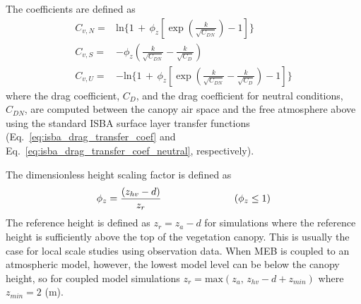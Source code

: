 The coefficients are defined as
%
\begin{align}
%
\label{eq:meb_fv_velc_neutral_c} 
C_{v,N} =& {\mathrm{ln}} \Bigg\lbrace 
1 \,+\, \phi_z
\left[\exp \left({\frac{k}{\sqrt{C_{DN}}}}\right) - 1\right]
\Bigg\rbrace 
\\
%
\label{eq:meb_fv_velc_stable_c} 
C_{v,S} =& -
\phi_z
\left(
{\frac{k}{\sqrt{C_{DN}}}}-{\frac{k}{\sqrt{C_{D}}}}
\right)
\\
%
\label{eq:meb_fv_velc_unstable_c} 
C_{v,U} =& -{\mathrm{ln}} \Bigg\lbrace 
1 \,+\, \phi_z
\left[\exp \left(
{\frac{k}{\sqrt{C_{DN}}}}-{\frac{k}{\sqrt{C_{D}}}}
\right) 
- 1\right]
\Bigg\rbrace 
%
\end{align}
%
where the drag coefficient, $C_D$, and the drag coefficient for
neutral conditions, $C_{DN}$, are computed between the
canopy air space 
and the free atmosphere above using the standard ISBA
surface layer
transfer functions (Eq.~\ref{eq:isba_drag_transfer_coef} and
Eq.~\ref{eq:isba_drag_transfer_coef_neutral}, respectively).




The dimensionless height scaling factor
is defined as 
%
\begin{equation}
%
\label{eq:meb_z_ratio_measure} 
\phi_z = {\frac{\left(z_{hv}-d\right)}{z_r}}
\hskip1.in
\left( \phi_z\leq 1 \right)
\end{equation}
%
The reference height is defined as $z_r=z_a-d$
for simulations where the reference height is sufficiently above
the top of the vegetation canopy. This is usually the case for local
scale studies using observation data.
When MEB is coupled to an atmospheric model, however, the lowest model
level can be below the canopy height, so for coupled model
simulations
$z_r = {\mathrm{max}}\left(z_a,\,z_{hv}-d+z_{min}\right)$
where $z_{min}=2$ (m).



